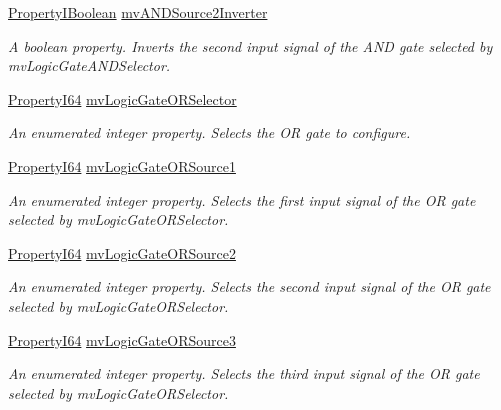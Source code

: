 \begin{DoxyCompactItemize}
\hyperlink{group___common_interface_ga44f9437e24b21b6c93da9039ec6786aa}{Property\+I\+Boolean} \hyperlink{classmv_i_m_p_a_c_t_1_1acquire_1_1_gen_i_cam_1_1mv_logic_gate_control_af34f748bfd0df08d6c5a915794a0eea2}{mv\+A\+N\+D\+Source2\+Inverter}
\begin{DoxyCompactList}\small\item\em A boolean property. Inverts the second input signal of the A\+N\+D gate selected by mv\+Logic\+Gate\+A\+N\+D\+Selector. \end{DoxyCompactList}\item 
\hyperlink{group___common_interface_ga81749b2696755513663492664a18a893}{Property\+I64} \hyperlink{classmv_i_m_p_a_c_t_1_1acquire_1_1_gen_i_cam_1_1mv_logic_gate_control_ad9652a51b62c599a9301d99d9fb5452d}{mv\+Logic\+Gate\+O\+R\+Selector}
\begin{DoxyCompactList}\small\item\em An enumerated integer property. Selects the O\+R gate to configure. \end{DoxyCompactList}\item 
\hyperlink{group___common_interface_ga81749b2696755513663492664a18a893}{Property\+I64} \hyperlink{classmv_i_m_p_a_c_t_1_1acquire_1_1_gen_i_cam_1_1mv_logic_gate_control_a7036f5051e1126c79f002edb61934005}{mv\+Logic\+Gate\+O\+R\+Source1}
\begin{DoxyCompactList}\small\item\em An enumerated integer property. Selects the first input signal of the O\+R gate selected by mv\+Logic\+Gate\+O\+R\+Selector. \end{DoxyCompactList}\item 
\hyperlink{group___common_interface_ga81749b2696755513663492664a18a893}{Property\+I64} \hyperlink{classmv_i_m_p_a_c_t_1_1acquire_1_1_gen_i_cam_1_1mv_logic_gate_control_a353a54d135685ff6a49fcdf63cf8a1eb}{mv\+Logic\+Gate\+O\+R\+Source2}
\begin{DoxyCompactList}\small\item\em An enumerated integer property. Selects the second input signal of the O\+R gate selected by mv\+Logic\+Gate\+O\+R\+Selector. \end{DoxyCompactList}\item 
\hyperlink{group___common_interface_ga81749b2696755513663492664a18a893}{Property\+I64} \hyperlink{classmv_i_m_p_a_c_t_1_1acquire_1_1_gen_i_cam_1_1mv_logic_gate_control_a9a15bc3b47b09064645418e4ba079948}{mv\+Logic\+Gate\+O\+R\+Source3}
\begin{DoxyCompactList}\small\item\em An enumerated integer property. Selects the third input signal of the O\+R gate selected by mv\+Logic\+Gate\+O\+R\+Selector. \end{DoxyCompactList}\item 

\end{DoxyCompactItemize}
